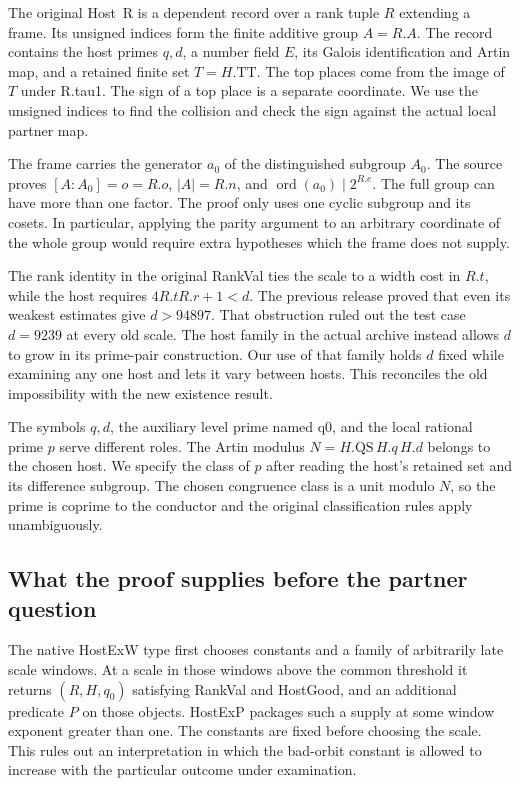 \documentclass[12pt,letterpaper]{article}
\DeclareRobustCommand{\id}[1]{\mbox{\small\ttfamily #1}}
\begin{document}
The original \id{Host R} is a dependent record over a rank tuple \(R\) extending a frame. Its unsigned indices form the finite additive group \(A=R.A\). The record contains the host primes \(q,d\), a number field \(E\), its Galois identification and Artin map, and a retained finite set \(T=H.\mathrm{TT}\). The top places come from the image of \(T\) under \id{R.tau1}. The sign of a top place is a separate coordinate. We use the unsigned indices to find the collision and check the sign against the actual local partner map.

The frame carries the generator \(a_0\) of the distinguished subgroup \(A_0\). The source proves \([A:A_0]=o=R.o\), \(|A|=R.n\), and \(\operatorname{ord}(a_0)\mid2^{R.e}\). The full group can have more than one factor. The proof only uses one cyclic subgroup and its cosets. In particular, applying the parity argument to an arbitrary coordinate of the whole group would require extra hypotheses which the frame does not supply.

The rank identity in the original \id{RankVal} ties the scale to a width cost in \(R.t\), while the host requires \(4R.tR.r+1<d\). The previous release proved that even its weakest estimates give \(d>94897\). That obstruction ruled out the test case \(d=9239\) at every old scale. The host family in the actual archive instead allows \(d\) to grow in its prime-pair construction. Our use of that family holds \(d\) fixed while examining any one host and lets it vary between hosts. This reconciles the old impossibility with the new existence result.

The symbols \(q,d\), the auxiliary level prime named \id{q0}, and the local rational prime \(p\) serve different roles. The Artin modulus \(N=H.\mathrm{QS}\,H.q\,H.d\) belongs to the chosen host. We specify the class of \(p\) after reading the host's retained set and its difference subgroup. The chosen congruence class is a unit modulo \(N\), so the prime is coprime to the conductor and the original classification rules apply unambiguously.

\subsection{What the proof supplies before the partner question}

The native \id{HostExW} type first chooses constants and a family of arbitrarily late scale windows. At a scale in those windows above the common threshold it returns \((R,H,q_0)\) satisfying \id{RankVal} and \id{HostGood}, and an additional predicate \(P\) on those objects. \id{HostExP} packages such a supply at some window exponent greater than one. The constants are fixed before choosing the scale. This rules out an interpretation in which the bad-orbit constant is allowed to increase with the particular outcome under examination.
\end{document}
